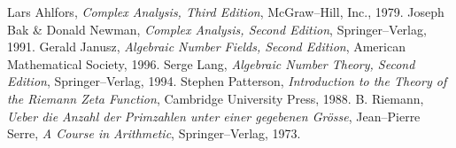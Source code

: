 \documentclass[12pt]{article}
\theoremstyle{definition}
\begin{document}
\begin{thebibliography}{9}
 Lars Ahlfors, \emph{Complex Analysis, Third Edition},
McGraw--Hill, Inc., 1979.
 Joseph Bak \& Donald Newman, \emph{Complex
Analysis, Second Edition}, Springer--Verlag, 1991.
 Gerald Janusz, \emph{Algebraic Number Fields, Second
Edition}, American Mathematical Society, 1996.
 Serge Lang, \emph{Algebraic Number Theory, Second
Edition}, Springer--Verlag, 1994.
 Stephen Patterson, \emph{Introduction to the Theory
of the Riemann Zeta Function}, Cambridge University Press, 1988.
 B. Riemann, \emph{Ueber die Anzahl der Primzahlen unter einer gegebenen Gr\"osse}, 
 Jean--Pierre Serre, \emph{A Course in Arithmetic},
Springer--Verlag, 1973.
\end{thebibliography}

\end{document}
